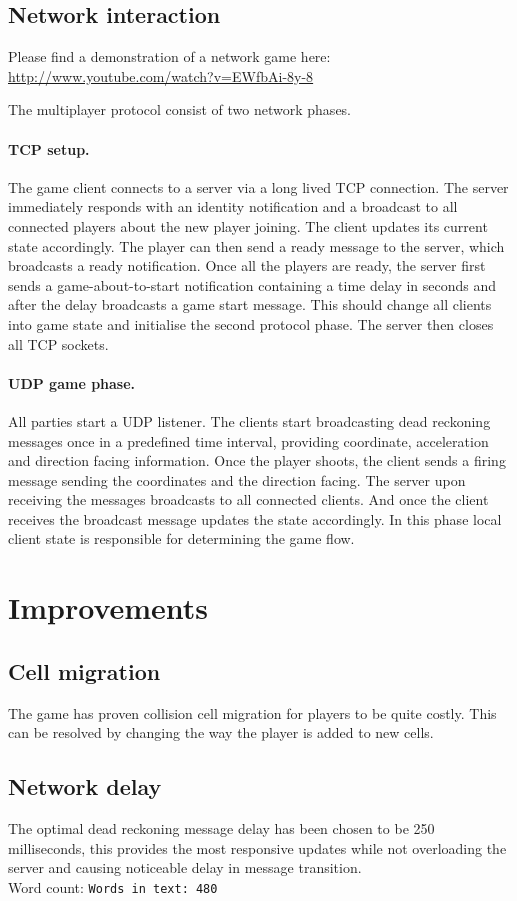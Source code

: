 \documentclass[11pt]{article} %
\begin{document}
\subsection{Network interaction}

Please find a demonstration of a network game here: \url{http://www.youtube.com/watch?v=EWfbAi-8y-8} 

The multiplayer protocol consist of two network phases.

\paragraph{TCP setup.} The game client connects to a server via a long lived TCP connection. The server immediately responds with an identity notification and a broadcast to all connected players about the new player joining. The client updates its current state accordingly. The player can then send a ready message to the server, which broadcasts a ready notification. Once all the players are ready, the server first sends a game-about-to-start notification containing a time delay in seconds and after the delay broadcasts a game start message. This should change all clients into game state and initialise the second protocol phase. The server then closes all TCP sockets.

\paragraph{UDP game phase.} All parties start a UDP listener. The clients start broadcasting dead reckoning messages once in a predefined time interval, providing coordinate, acceleration and direction facing information. Once the player shoots, the client sends a firing message sending the coordinates and the direction facing. The server upon receiving the messages broadcasts to all connected clients. And once the client receives the broadcast message updates the state accordingly. In this phase local client state is responsible for determining the game flow.

\section{Improvements}

\subsection{Cell migration}

The game has proven collision cell migration for players to be quite costly. This can be resolved by changing the way the player is added to new cells.

\subsection{Network delay}

The optimal dead reckoning message delay has been chosen to be 250 milliseconds, this provides the most responsive updates while not overloading the server and causing noticeable delay in message transition.\\

Word count: \verb+Words in text: 480+
\end{document}
